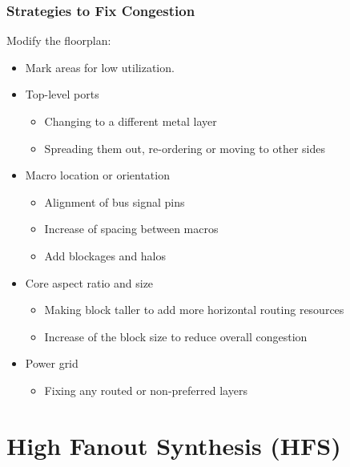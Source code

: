 \documentclass[compress]{beamer}
\begin{document}
\begin{frame}
	\frametitle{Strategies to Fix Congestion}
	Modify the floorplan:
	\begin{itemize}
		\item Mark areas for low utilization.
		\item Top-level ports
			 \begin{itemize}
			\item Changing to a different metal layer
			\item Spreading them out, re-ordering or moving to other sides
		\end{itemize}
		\item Macro location or orientation
		\begin{itemize}
			\item Alignment of bus signal pins
			\item Increase of spacing between macros
			\item Add blockages and halos
		\end{itemize}
		\item Core aspect ratio and size
			 \begin{itemize}
			\item Making block taller to add more horizontal routing resources
			\item Increase of the block size to reduce overall congestion
		\end{itemize}
		\item Power grid
			 \begin{itemize}
			\item Fixing any routed or non-preferred layers
		\end{itemize}
	\end{itemize}

\end{frame}

\section[HFNS]{High Fanout Synthesis (HFS)}
\end{document}
